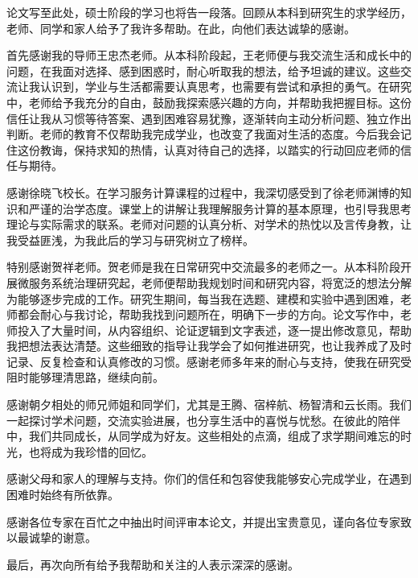 \begin{acknowledgements}

论文写至此处，硕士阶段的学习也将告一段落。回顾从本科到研究生的求学经历，老师、同学和家人给予了我许多帮助。在此，向他们表达诚挚的感谢。

首先感谢我的导师王忠杰老师。从本科阶段起，王老师便与我交流生活和成长中的问题，在我面对选择、感到困惑时，耐心听取我的想法，给予坦诚的建议。这些交流让我认识到，学业与生活都需要认真思考，也需要有尝试和承担的勇气。在研究中，老师给予我充分的自由，鼓励我探索感兴趣的方向，并帮助我把握目标。这份信任让我从习惯等待答案、遇到困难容易犹豫，逐渐转向主动分析问题、独立作出判断。老师的教育不仅帮助我完成学业，也改变了我面对生活的态度。今后我会记住这份教诲，保持求知的热情，认真对待自己的选择，以踏实的行动回应老师的信任与期待。

感谢徐晓飞校长。在学习服务计算课程的过程中，我深切感受到了徐老师渊博的知识和严谨的治学态度。课堂上的讲解让我理解服务计算的基本原理，也引导我思考理论与实际需求的联系。老师对问题的认真分析、对学术的热忱以及言传身教，让我受益匪浅，为我此后的学习与研究树立了榜样。

特别感谢贺祥老师。贺老师是我在日常研究中交流最多的老师之一。从本科阶段开展微服务系统治理研究起，老师便帮助我规划时间和研究内容，将宽泛的想法分解为能够逐步完成的工作。研究生期间，每当我在选题、建模和实验中遇到困难，老师都会耐心与我讨论，帮助我找到问题所在，明确下一步的方向。论文写作中，老师投入了大量时间，从内容组织、论证逻辑到文字表述，逐一提出修改意见，帮助我把想法表达清楚。这些细致的指导让我学会了如何推进研究，也让我养成了及时记录、反复检查和认真修改的习惯。感谢老师多年来的耐心与支持，使我在研究受阻时能够理清思路，继续向前。

感谢朝夕相处的师兄师姐和同学们，尤其是王腾、宿梓航、杨智清和云长雨。我们一起探讨学术问题，交流实验进展，也分享生活中的喜悦与忧愁。在彼此的陪伴中，我们共同成长，从同学成为好友。这些相处的点滴，组成了求学期间难忘的时光，也将成为我珍惜的回忆。

感谢父母和家人的理解与支持。你们的信任和包容使我能够安心完成学业，在遇到困难时始终有所依靠。

感谢各位专家在百忙之中抽出时间评审本论文，并提出宝贵意见，谨向各位专家致以最诚挚的谢意。

最后，再次向所有给予我帮助和关注的人表示深深的感谢。
\end{acknowledgements}
